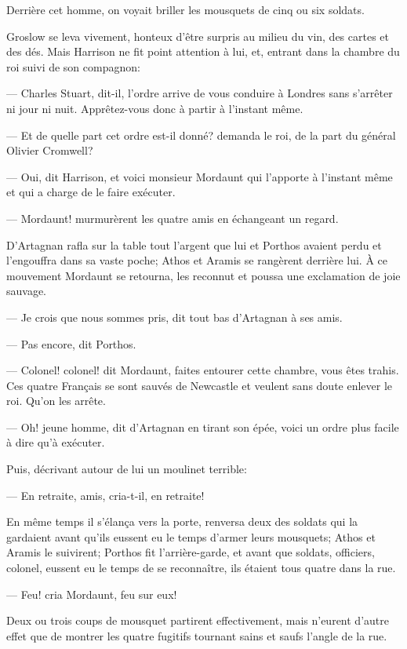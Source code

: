 Derrière cet homme, on voyait briller les mousquets de cinq ou six soldats.

Groslow se leva vivement, honteux d'être surpris au milieu du vin, des cartes et des dés. Mais Harrison ne fit point attention à lui, et, entrant dans la chambre du roi suivi de son compagnon:

— Charles Stuart, dit-il, l'ordre arrive de vous conduire à Londres sans s'arrêter ni jour ni nuit. Apprêtez-vous donc à partir à l'instant même.

— Et de quelle part cet ordre est-il donné? demanda le roi, de la part du général Olivier Cromwell?

— Oui, dit Harrison, et voici monsieur Mordaunt qui l'apporte à l'instant même et qui a charge de le faire exécuter.

— Mordaunt! murmurèrent les quatre amis en échangeant un regard.

D'Artagnan rafla sur la table tout l'argent que lui et Porthos avaient perdu et l'engouffra dans sa vaste poche; Athos et Aramis se rangèrent derrière lui. À ce mouvement Mordaunt se retourna, les reconnut et poussa une exclamation de joie sauvage.

— Je crois que nous sommes pris, dit tout bas d'Artagnan à ses amis.

— Pas encore, dit Porthos.

— Colonel! colonel! dit Mordaunt, faites entourer cette chambre, vous êtes trahis. Ces quatre Français se sont sauvés de Newcastle et veulent sans doute enlever le roi. Qu'on les arrête.

— Oh! jeune homme, dit d'Artagnan en tirant son épée, voici un ordre plus facile à dire qu'à exécuter.

Puis, décrivant autour de lui un moulinet terrible:

— En retraite, amis, cria-t-il, en retraite!

En même temps il s'élança vers la porte, renversa deux des soldats qui la gardaient avant qu'ils eussent eu le temps d'armer leurs mousquets; Athos et Aramis le suivirent; Porthos fit l'arrière-garde, et avant que soldats, officiers, colonel, eussent eu le temps de se reconnaître, ils étaient tous quatre dans la rue.

— Feu! cria Mordaunt, feu sur eux!

Deux ou trois coups de mousquet partirent effectivement, mais n'eurent d'autre effet que de montrer les quatre fugitifs tournant sains et saufs l'angle de la rue.

